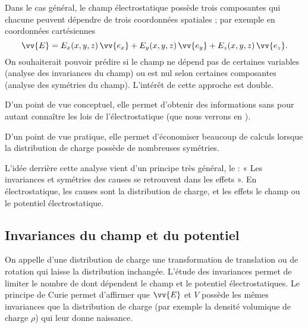 \documentclass[12pt,fancy]{/Users/victor/Documents/COURS/2ACapECL/texmf/tex/latex/Preambles/cours}
\begin{document}
Dans le cas général, le champ électrostatique possède trois composantes qui chacune peuvent dépendre de trois coordonnées spatiales ; par exemple en coordonnées cartésiennes
\begin{equation*}
\vv{E}=E_x(x,y,z)\,\vv{e_x}+E_y(x,y,z)\,\vv{e_y}+E_z(x,y,z)\,\vv{e_z}.
\end{equation*}
On souhaiterait pouvoir prédire si le champ ne dépend pas de certaines variables (analyse des invariances du champ) ou est nul selon certaines composantes (analyse des symétries du champ). L’intérêt de cette approche est double.
\begin{liste}
\item D’un point de vue conceptuel, elle permet d’obtenir des informations sans pour autant connaître les lois de l’électrostatique (que nous verrons en ).
\item D’un point de vue pratique, elle permet d’économiser beaucoup de calculs lorsque la distribution de charge possède de nombreuses symétries.
\end{liste}
 L’idée derrière cette analyse vient d’un principe très général, le  : « Les invariances et symétries des causes se retrouvent dans les effets ».
En électrostatique, les causes sont la distribution de charge, et les effets le champ ou le potentiel électrostatique. 

\subsection{Invariances du champ et du potentiel}


On appelle  d'une distribution de charge une transformation de translation ou de rotation qui laisse la distribution inchangée. L'étude des invariances permet de limiter le nombre de  dont dépendent le champ et le potentiel électrostatiques. Le principe de Curie permet d'affirmer que $\vv{E}$ et $V$ possède les mêmes invariances que la distribution de charge (par exemple la densité volumique de charge $\rho$) qui leur donne naissance.
\end{document}
